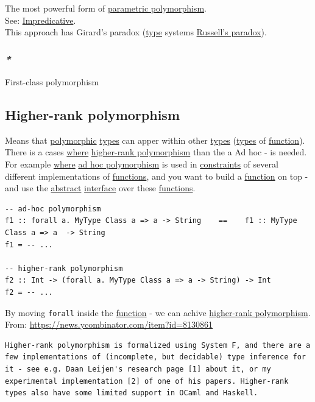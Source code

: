 \documentclass[a4paper,14pt,oneside]{book}
\begin{document}
The most powerful form of \hyperref[org7500c38]{parametric polymorphism}.\\
See: \hyperref[org45d0635]{Impredicative}.\\

This approach has Girard's paradox (\hyperref[org86debe5]{type} systems \hyperref[org0c83154]{Russell's paradox}).\\

\subsubsection{\emph{*}}
\label{sec:orga4c5dfa}

\label{orgfad866a}First-class polymorphism\\

\subsection{\label{orgdebc72c}Higher-rank polymorphism}
\label{sec:orgbb3f191}
Means that \hyperref[orgede9994]{polymorphic} \hyperref[orgb4b53b9]{types} can apper within other \hyperref[orgb4b53b9]{types} (\hyperref[orgb4b53b9]{types} of \hyperref[org13e0181]{function}).\\
There is a cases \hyperref[org57c81dc]{where} \hyperref[orgdebc72c]{higher-rank polymorphism} than the a Ad hoc - is needed. For example \hyperref[org57c81dc]{where} \hyperref[org3ee9179]{ad hoc polymorphism} is used in \hyperref[orgbf9ce87]{constraints} of several different implementations of \hyperref[org41df67c]{functions}, and you want to build a \hyperref[org13e0181]{function} on top - and use the \hyperref[org75cc3a2]{abstract} \hyperref[orgcff22eb]{interface} over these \hyperref[org41df67c]{functions}.\\
\begin{verbatim}
-- ad-hoc polymorphism
f1 :: forall a. MyType Class a => a -> String    ==    f1 :: MyType Class a => a  -> String
f1 = -- ...

-- higher-rank polymorphism
f2 :: Int -> (forall a. MyType Class a => a -> String) -> Int
f2 = -- ...
\end{verbatim}
By moving \texttt{forall} inside the \hyperref[org13e0181]{function} - we can achive \hyperref[orgdebc72c]{higher-rank polymorphism}.\\

From: \url{https://news.ycombinator.com/item?id=8130861}\\
\begin{verbatim}
Higher-rank polymorphism is formalized using System F, and there are a few implementations of (incomplete, but decidable) type inference for it - see e.g. Daan Leijen's research page [1] about it, or my experimental implementation [2] of one of his papers. Higher-rank types also have some limited support in OCaml and Haskell.
\end{verbatim}
\end{document}
